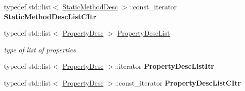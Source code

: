 \begin{DoxyCompactItemize}
\item 
typedef std\+::list$<$ \hyperlink{classagm_1_1reflection_1_1_static_method_desc}{Static\+Method\+Desc} $>$\+::const\+\_\+iterator {\bfseries Static\+Method\+Desc\+List\+C\+Itr}\hypertarget{classagm_1_1reflection_1_1_class_desc_a2c77761df8e5df609754eb6733a8008b}{}\label{classagm_1_1reflection_1_1_class_desc_a2c77761df8e5df609754eb6733a8008b}

\item 
typedef std\+::list$<$ \hyperlink{classagm_1_1reflection_1_1_property_desc}{Property\+Desc} $>$ \hyperlink{classagm_1_1reflection_1_1_class_desc_aed6874712c84179435e26d7180a0c120}{Property\+Desc\+List}\hypertarget{classagm_1_1reflection_1_1_class_desc_aed6874712c84179435e26d7180a0c120}{}\label{classagm_1_1reflection_1_1_class_desc_aed6874712c84179435e26d7180a0c120}

\begin{DoxyCompactList}\small\item\em type of list of properties \end{DoxyCompactList}\item 
typedef std\+::list$<$ \hyperlink{classagm_1_1reflection_1_1_property_desc}{Property\+Desc} $>$\+::iterator {\bfseries Property\+Desc\+List\+Itr}\hypertarget{classagm_1_1reflection_1_1_class_desc_a240272839de7d626ead6beeaecc722b5}{}\label{classagm_1_1reflection_1_1_class_desc_a240272839de7d626ead6beeaecc722b5}

\item 
typedef std\+::list$<$ \hyperlink{classagm_1_1reflection_1_1_property_desc}{Property\+Desc} $>$\+::const\+\_\+iterator {\bfseries Property\+Desc\+List\+C\+Itr}\hypertarget{classagm_1_1reflection_1_1_class_desc_acc0a2d37ca48e32f3dc4e7aa7b9c4509}{}\label{classagm_1_1reflection_1_1_class_desc_acc0a2d37ca48e32f3dc4e7aa7b9c4509}

\end{DoxyCompactItemize}
